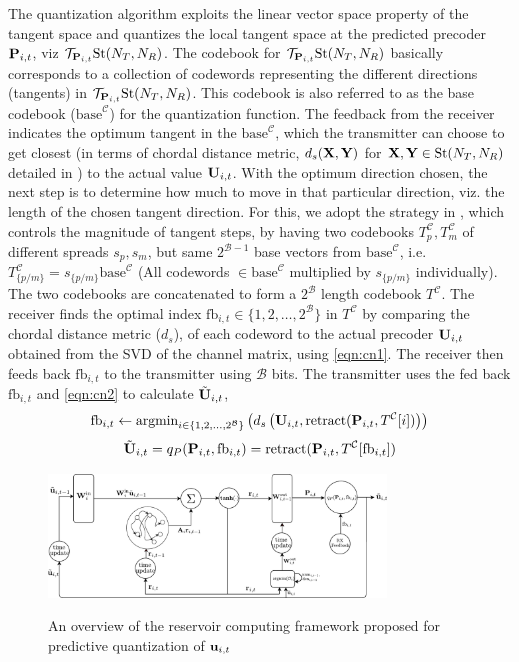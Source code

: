 \documentclass[conference]{IEEEtran}
\begin{document}
The quantization algorithm exploits the linear vector space property of the tangent space and quantizes the local tangent space at the predicted precoder ${\bf P}_{i,t}$, viz $\mathcal{T}_{{\bf P}_{i,t}} \text{St}(N_T,N_R)$.
The codebook for $\mathcal{T}_{{\bf P}_{i,t}} \text{St}(N_T,N_R)$ basically corresponds to a collection of codewords representing the different directions (tangents) in $\mathcal{T}_{{\bf P}_{i,t}} \text{St}(N_T,N_R)$.
This codebook is also referred to as the base codebook ($\text{base}^{\mathcal{C}}$) for the quantization function.
The feedback from the receiver indicates the optimum tangent in the $\text{base}^{\mathcal{C}}$, which the transmitter can choose to get closest (in terms of chordal distance metric, $d_s({\bf X},{\bf Y})$ for ${\bf X},{\bf Y} \in \text{St}(N_T,N_R)$ detailed in \cite{Gupt1905:Predictive,6891198}) to the actual value ${\bf U}_{i,t}$.
With the optimum direction chosen, the next step is to determine how much to move in that particular direction, viz. the length of the chosen tangent direction.
For this, we adopt the strategy in \cite{6891198}, which
controls the magnitude of tangent steps, by having two codebooks
$T^{\mathcal{C}}_p,T^{\mathcal{C}}_m$ of different spreads $s_p,s_m$, but same $2^{\mathcal{B}-1}$ base vectors from $\text{base}^{\mathcal{C}}$, i.e. $T^{\mathcal{C}}_{\{p/m\}}=s_{\{p/m\}}\text{base}^{\mathcal{C}}$ (All codewords $\in \text{base}^{\mathcal{C}}$ multiplied by $s_{\{p/m\}}$ individually). 
The two codebooks are concatenated to form a $2^\mathcal{B}$ length codebook $T^\mathcal{C}$. 
The receiver finds the optimal index $\text{fb}_{i,t} \in \{1,2,\ldots,2^{\mathcal{B}}\}$ in $T^\mathcal{C}$ by comparing the chordal distance metric ($d_s$), of each codeword to the actual precoder ${\bf U}_{i,t}$ obtained from the SVD of the channel matrix, using \eqref{eqn:cn1}. The receiver then feeds back $\text{fb}_{i,t}$ to the transmitter using $\mathcal{B}$ bits. The transmitter uses the fed back $\text{fb}_{i,t}$ and \eqref{eqn:cn2} to calculate $\tilde{{\bf U}}_{i,t}$,
\begin{equation}
\label{eqn:cn1}
\text{fb}_{i,t} \gets \text{argmin}_{i \in \{1,2,\ldots,2^{\mathcal{B}}\}}\left (d_s\left (\bU_{i,t},\text{retract}(\bP_{i,t},T^\mathcal{C}[i])\right ) \right)
\end{equation}
\begin{equation}
\tilde{\bU}_{i,t}=q_P(\bP_{i,t},\text{fb}_{i,t})=\text{retract}(\bP_{i,t},T^\mathcal{C}[\text{fb}_{i,t}])
\label{eqn:cn2}
\end{equation}
\begin{figure}[ht]
\centering
\includegraphics[width=0.8\textwidth]{images/system.pdf}
\label{res_overview}
\caption{An overview of the reservoir computing framework proposed for predictive quantization of ${\bf u}_{i,t}$}
\end{figure}
\end{document}

